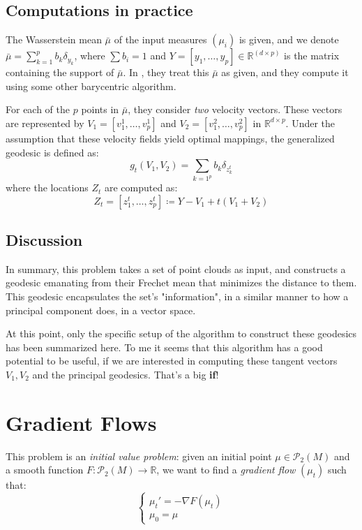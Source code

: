 \documentclass{article}
\begin{document}
\subsection{Computations in practice}

The Wasserstein mean $\bar\mu$ of the input measures $(\mu_i)$ is given,
and we denote $\bar\mu = \sum_{k=1}^pb_k\delta_{y_k}$, where $\sum b_i=1$
and $Y=[y_1,\dots, y_p]\in \mathbb{R}^(d\times p)$ is the matrix containing
the support of $\bar\mu$. In \cite{seguy2015principal}, they treat this $\bar\mu$
as given, and they compute it using some other barycentric algorithm.

For each of the $p$ points in $\bar\mu$, they consider \textit{two} velocity 
vectors. These vectors are represented by $V_1=[v_1^1,\dots,v_p^1]$ and  
$V_2=[v_1^2,\dots,v_p^2]$ in $\mathbb{R}^{d\times p}$. Under the assumption
that these velocity fields yield optimal mappings, the generalized geodesic
is defined as:
\[g_t(V_1, V_2) = \sum_{k=1^p}b_k\delta_{z^t_k} \]
where the locations $Z_t$ are computed as:
\[ Z_t = [z_1^t,\dots,z_p^t] \coloneqq Y-V_1 + t(V_1+V_2)\]

\subsection{Discussion}

In summary, this problem takes a set of point clouds as input, and constructs 
a geodesic emanating from their Frechet mean that minimizes the distance 
to them. This geodesic encapsulates the set's "information", in a similar 
manner to how a principal component does, in a vector space.

At this point, only the specific setup of the algorithm to construct these
geodesics has been summarized here. To me it seems that this algorithm has
a good potential to be useful, if we are interested in computing these tangent 
vectors $V_1, V_2$ and the principal geodesics. That's a big \textbf{if}!

\section{Gradient Flows}

This problem is an \textit{initial value problem}: given an initial point 
$\mu\in \mathscr{P}_2(M)$ and a smooth function $F:\mathscr{P}_2(M)\rightarrow
\mathbb{R}$, we want to find a \textit{gradient flow} $(\mu_t)$ such that:
\begin{equation*}
\begin{cases}
    \mu_t' = -\nabla F(\mu_t) \\
    \mu_0 = \mu
\end{cases}       
\end{equation*}
\end{document}
